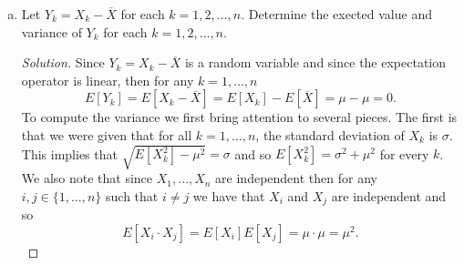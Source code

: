 \documentclass[12pt]{article}
\newenvironment{solution}
{\renewcommand\qedsymbol{$\blacksquare$}\begin{proof}[Solution]}
{\end{proof}}
\begin{document}
\begin{enumerate}
\begin{enumerate}[(a)]
\begin{solution}
                        \begin{equation*}
                            Var\bigg(\sum_{k=1}^{n}X_k\bigg)=\sum_{k=1}^{n}Var(X_k)
                            =n\sigma^2.
                        \end{equation*}
                        Since $1/n\in\mathbb{R}$ for every $n\in\mathbb{N}$,
                        then by properties of the variance, it follows that 
                        \begin{equation*}
                            Var(\overline{X})=Var\bigg(\frac{1}{n}\sum_{k=1}^{n}X_k\bigg)
                            =\bigg(\frac{1}{n}\bigg)^2\sum_{k=1}^{n}Var(X_k)
                            =\frac{1}{n^2}(n\sigma^2)=\frac{\sigma^2}{n}. 
                        \end{equation*}
                    \end{solution}
                \item Let $Y_k=X_k-\overline{X}$ for each $k=1, 2, \dots, n$.
                    Determine the exected value and variance of $Y_k$ for each
                    $k=1, 2, \dots, n$. 
                    \begin{solution}
                        Since $Y_k=X_k-\overline{X}$ is a random variable and
                        since the expectation operator is linear, then for any
                        $k=1, \dots, n$
                        \begin{equation*}
                            E[Y_k]=E[X_k-\overline{X}]=E[X_k]-E[\overline{X}]
                            =\mu-\mu=0.
                        \end{equation*}
                        To compute the variance we first bring attention to
                        several pieces. The first is that we were given that
                        for all $k=1, \dots, n$, the standard deviation of
                        $X_k$ is $\sigma$. This implies that
                        $\sqrt{E[X_k^2]-\mu^2}=\sigma$ and so
                        $E[X_k^2]=\sigma^2+\mu^2$ for every $k$. We also note
                        that since $X_1, \dots, X_n$ are independent then for
                        any $i, j\in\{1, \dots, n\}$ such that $i\neq j$ we
                        have that $X_i$ and $X_j$ are independent and so 
                        \begin{equation*}
                            E[X_i\cdot X_j]=E[X_i]E[X_j]=\mu\cdot\mu=\mu^2.
                        \end{equation*}

\end{solution}
\end{enumerate}
\end{enumerate}
\end{document}
